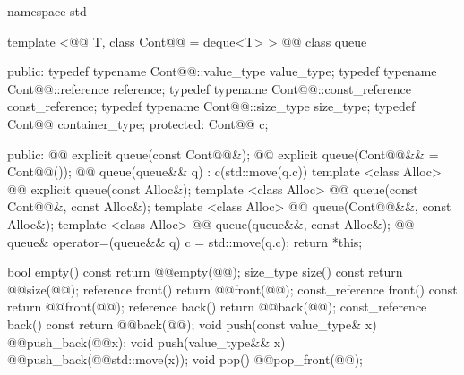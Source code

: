 \documentclass[american,twoside]{book}
\begin{document}
\begin{codeblock}
namespace std {
  template <@@ T, class Cont@@ = deque<T> >
  @@
  class queue {
  public:
    typedef typename Cont@@::value_type            value_type;
    typedef typename Cont@@::reference             reference;
    typedef typename Cont@@::const_reference       const_reference;
    typedef typename Cont@@::size_type             size_type;
    typedef          Cont@@                        container_type;
  protected:
    Cont@@ c;

  public:
    @@ explicit queue(const Cont@@&);
    @@ explicit queue(Cont@@&& = Cont@@());
    @@ queue(queue&& q) : c(std::move(q.c)) {}
    template <class Alloc> 
      @@
      explicit queue(const Alloc&);
    template <class Alloc> 
      @@
      queue(const Cont@@&, const Alloc&);
    template <class Alloc> 
      @@
      queue(Cont@@&&, const Alloc&);
    template <class Alloc> 
      @@
      queue(queue&&, const Alloc&);
    @@ queue& operator=(queue&& q)
                                        { c = std::move(q.c); return *this; }

    bool              empty() const     { return @@empty(@@); }
    size_type         size()  const     { return @@size(@@); }
    reference         front()           { return @@front(@@); }
    const_reference   front() const     { return @@front(@@); }
    reference         back()            { return @@back(@@); }
    const_reference   back() const      { return @@back(@@); }
    void push(const value_type& x)      { @@push_back(@@x); }
    void push(value_type&& x)           { @@push_back(@@std::move(x)); }
    void pop()                          { @@pop_front(@@); }
    
}}
\end{codeblock}
\end{document}
